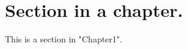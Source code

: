 \section{Section in a chapter.}\label{sec:Chapter1/Sectioninachapter.}
This is a section in "Chapter1".

